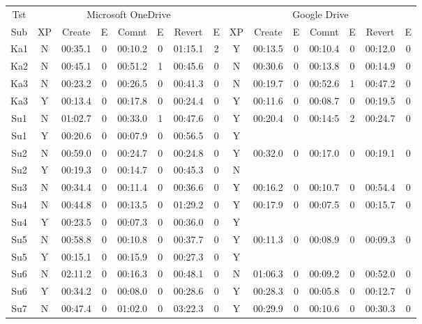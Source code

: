 \documentclass[a4paper,12pt]{article}
\begin{document}
\begin{table}[h]
\footnotesize
\centering
\begin{tabular}{|c|c|c|c|c|c|c|c|c|c|c|c|c|c|c|}
		\hline
		Tst& \multicolumn{7}{c}{Microsoft OneDrive} & \multicolumn{7}{|c|}{Google Drive} \\
		Sub & XP&Create&E&Comnt&E&Revert&E&XP&Create&E&Comnt&E&Revert&E\\ \hline
Ka1&N&00:35.1&0&00:10.2&0&01:15.1&2&Y&00:13.5&0&00:10.4&0&00:12.0&0\\ \hline
Ka2&N&00:45.1&0&00:51.2&1&00:45.6&0&N&00:30.6&0&00:13.8&0&00:14.9&0\\ \hline
Ka3&N&00:23.2&0&00:26.5&0&00:41.3&0&N&00:19.7&0&00:52.6&1&00:47.2&0\\ \hline
Ka3&Y&00:13.4&0&00:17.8&0&00:24.4&0&Y&00:11.6&0&00:08.7&0&00:19.5&0\\ \hline
Su1&N&01:02.7&0&00:33.0&1&00:47.6&0&Y&00:20.4&0&00:14:5&2&00:24.7&0\\ \hline
Su1&Y&00:20.6&0&00:07.9&0&00:56.5&0&Y&\cellcolor[gray]{0.3}&\cellcolor[gray]{0.3}&\cellcolor[gray]{0.3}&\cellcolor[gray]{0.3}&\cellcolor[gray]{0.3}&\cellcolor[gray]{0.3}\\ \hline
Su2&N&00:59.0&0&00:24.7&0&00:24.8&0&Y&00:32.0&0&00:17.0&0&00:19.1&0\\ \hline
Su2&Y&00:19.3&0&00:14.7&0&00:45.3&0&N&\cellcolor[gray]{0.3}&\cellcolor[gray]{0.3}&\cellcolor[gray]{0.3}&\cellcolor[gray]{0.3}&\cellcolor[gray]{0.3}&\cellcolor[gray]{0.3}\\ \hline
Su3&N&00:34.4&0&00:11.4&0&00:36.6&0&Y&00:16.2&0&00:10.7&0&00:54.4&0\\ \hline
Su4&N&00:44.8&0&00:13.5&0&01:29.2&0&Y&00:17.9&0&00:07.5&0&00:15.7&0\\ \hline
Su4&Y&00:23.5&0&00:07.3&0&00:36.0&0&Y&\cellcolor[gray]{0.3}&\cellcolor[gray]{0.3}&\cellcolor[gray]{0.3}&\cellcolor[gray]{0.3}&\cellcolor[gray]{0.3}&\cellcolor[gray]{0.3}\\ \hline
Su5&N&00:58.8&0&00:10.8&0&00:37.7&0&Y&00:11.3&0&00:08.9&0&00:09.3&0\\ \hline
Su5&Y&00:15.1&0&00:15.9&0&00:27.3&0&Y&\cellcolor[gray]{0.3}&\cellcolor[gray]{0.3}&\cellcolor[gray]{0.3}&\cellcolor[gray]{0.3}&\cellcolor[gray]{0.3}&\cellcolor[gray]{0.3}\\ \hline
Su6&N&02:11.2&0&00:16.3&0&00:48.1&0&N&01:06.3&0&00:09.2&0&00:52.0&0\\ \hline
Su6&Y&00:34.2&0&00:08.0&0&00:28.6&0&Y&00:28.3&0&00:05.8&0&00:12.7&0\\ \hline
Su7&N&00:47.4&0&01:02.0&0&03:22.3&0&Y&00:29.9&0&00:10.6&0&00:30.3&0\\ \hline

\end{tabular}
\end{table}
\end{document}
